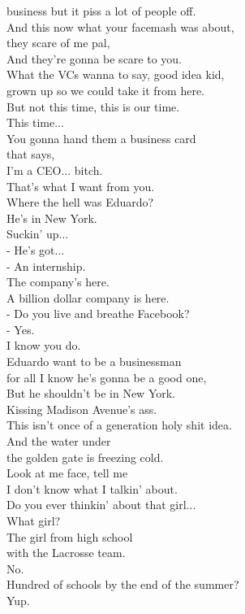 \documentclass{article}
\begin{document}
\begin{multicols}{3}
business but it piss a lot of people off.\\
And this now what your facemash was about,\\
they scare of me pal,\\
And they're gonna be scare to you.\\
What the VCs wanna to say, good idea kid,\\
grown up so we could take it from here.\\
But not this time, this is our time.\\
This time...\\
You gonna hand them a business card\\
that says,\\
I'm a CEO... bitch.\\
That's what I want from you.\\
Where the hell was Eduardo?\\
He's in New York.\\
Suckin' up...\\
- He's got...\\
- An internship.\\
The company's here.\\
A billion dollar company is here.\\
- Do you live and breathe Facebook?\\
- Yes.\\
I know you do.\\
Eduardo want to be a businessman\\
for all I know he's gonna be a good one,\\
But he shouldn't be in New York.\\
Kissing Madison Avenue's ass.\\
This isn't once of a generation holy shit idea.\\
And the water under\\
the golden gate is freezing cold.\\
Look at me face, tell me\\
I don't know what I talkin' about.\\
Do you ever thinkin' about that girl...\\
What girl?\\
The girl from high school\\
with the Lacrosse team.\\
No.\\
Hundred of schools by the end of the summer?\\
Yup.\\

\end{multicols}
\end{document}
